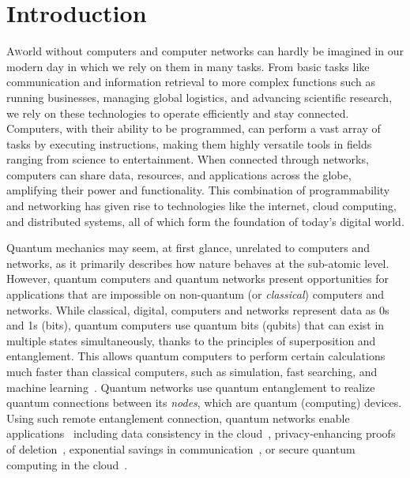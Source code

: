 \chapter{Introduction}
\label{chp:intro}

\lettrine{A} world without computers and computer networks can hardly be imagined in our modern day in which we rely on them in many tasks.
From basic tasks like communication and information retrieval to more complex functions such as running businesses, managing global logistics, and advancing scientific research, we rely on these technologies to operate efficiently and stay connected.
Computers, with their ability to be programmed, can perform a vast array of tasks by executing instructions, making them highly versatile tools in fields ranging from science to entertainment.
When connected through networks, computers can share data, resources, and applications across the globe, amplifying their power and functionality.
This combination of programmability and networking has given rise to technologies like the internet, cloud computing, and distributed systems, all of which form the foundation of today's digital world.

Quantum mechanics may seem, at first glance, unrelated to computers and networks, as it primarily describes how nature behaves at the sub-atomic level.
However, quantum computers and quantum networks present opportunities for applications that are impossible on non-quantum (or \emph{classical}) computers and networks.
While classical, digital, computers and networks represent data as 0s and 1s (bits), quantum computers use quantum bits (qubits) that can exist in multiple states simultaneously, thanks to the principles of superposition and entanglement.
This allows quantum computers to perform certain calculations much faster than classical computers, such as simulation, fast searching, and machine learning~\cite{montanaro_quantum_2016, dalzell_quantum_2023}.
Quantum networks use quantum entanglement to realize quantum connections between its \emph{nodes}, which are quantum (computing) devices.
Using such remote entanglement connection, quantum networks enable applications~\cite{wehner_2018_stages} including data consistency in the cloud~\cite{benor_2005_byzantine}, privacy-enhancing proofs of deletion~\cite{poremba_quantum_2022}, exponential savings in communication~\cite{guerin_exponential_2016}, or secure quantum computing in the cloud~\cite{broadbent_2009_ubqc,childs_2005_secure_qc}.

